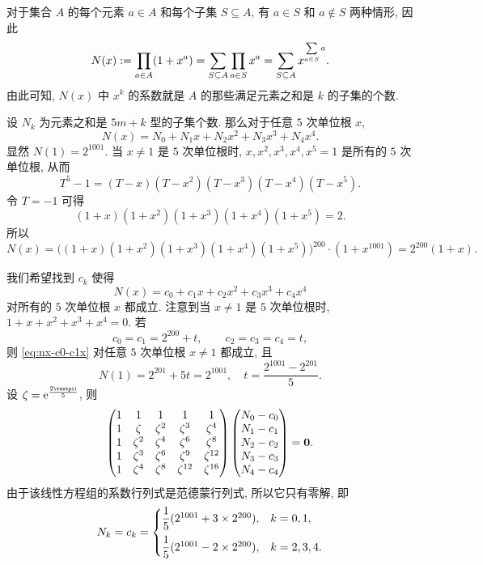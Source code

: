\begin{solution}
  对于集合 $A$ 的每个元素 $a\in A$ 和每个子集 $S\subseteq A$, 有 $a\in S$ 和 $a\notin S$ 两种情形, 因此
  \[
    N(x):=\prod_{a\in A}(1+x^a)
    =\sum_{S\subseteq A}\prod_{a\in S}x^a
    =\sum_{S\subseteq A}x^{\sum\limits_{a\in S}a}.
  \]
  由此可知, $N(x)$ 中 $x^k$ 的系数就是 $A$ 的那些满足元素之和是 $k$ 的子集的个数.

  设 $N_k$ 为元素之和是 $5m+k$ 型的子集个数.
  那么对于任意 $5$ 次单位根 $x$,
  \[
    N(x)=N_0+N_1x+N_2x^2+N_3x^3+N_4x^4.
  \]
  显然 $N(1)=2^{1001}$.
  当 $x\neq 1$ 是 $5$ 次单位根时, $x,x^2,x^3,x^4,x^5=1$ 是所有的 $5$ 次单位根, 从而
  \[
    T^5-1=(T-x)(T-x^2)(T-x^3)(T-x^4)(T-x^5).
  \]
  令 $T=-1$ 可得
  \[
    (1+x)(1+x^2)(1+x^3)(1+x^4)(1+x^5)=2.
  \]
  所以
  \[
    N(x)=\bigl((1+x)(1+x^2)(1+x^3)(1+x^4)(1+x^5)\bigr)^{200}\cdot(1+x^{1001})
    =2^{200}(1+x).
  \]

  我们希望找到 $c_k$ 使得
  \begin{equation}
    \label{eq:nx-c0-c1x}
    N(x)=c_0+c_1x+c_2x^2+c_3x^3+c_4x^4
  \end{equation}
  对所有的 $5$ 次单位根 $x$ 都成立.
  注意到当 $x\neq 1$ 是 $5$ 次单位根时, $1+x+x^2+x^3+x^4=0$.
  若
  \[
    c_0=c_1=2^{200}+t,\qquad c_2=c_3=c_4=t,
  \]
  则 \ref{eq:nx-c0-c1x} 对任意 $5$ 次单位根 $x\neq 1$ 都成立, 且
  \[
    N(1)=2^{201}+5t=2^{1001},\quad
    t=\frac{2^{1001}-2^{201}}5.
  \]
  设 $\zeta=\ee^{\frac{2\cpi\ii}5}$, 则
  \[
    \begin{pmatrix}
      1&1&1&1&1\\
      1&\zeta&\zeta^2&\zeta^3&\zeta^4\\
      1&\zeta^2&\zeta^4&\zeta^6&\zeta^8\\
      1&\zeta^3&\zeta^6&\zeta^9&\zeta^{12}\\
      1&\zeta^4&\zeta^8&\zeta^{12}&\zeta^{16}
    \end{pmatrix}\begin{pmatrix}
      N_0-c_0\\
      N_1-c_1\\
      N_2-c_2\\
      N_3-c_3\\
      N_4-c_4
    \end{pmatrix}={\bf0}.
  \]
  由于该线性方程组的系数行列式是范德蒙行列式, 所以它只有零解, 即
  \[
    N_k=c_k=\begin{cases}
      \dfrac15(2^{1001}+3\times 2^{200}),&k=0,1,\\[2\itemsep]
      \dfrac15(2^{1001}-2\times 2^{200}),&k=2,3,4.
    \end{cases}
  \]
\end{solution}



